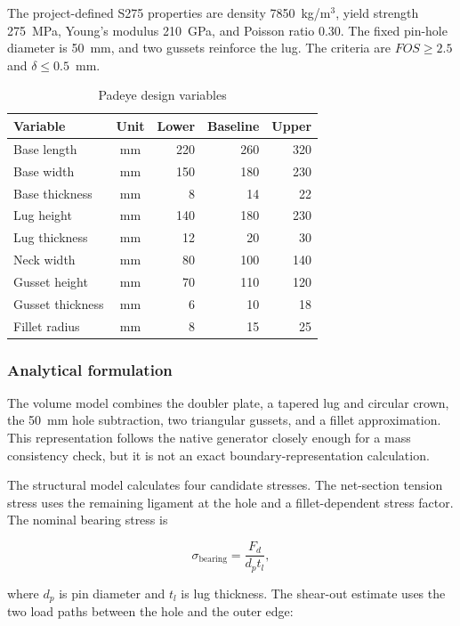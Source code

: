 The project-defined S275 properties are density 7850~kg/m$^3$, yield strength
275~MPa, Young's modulus 210~GPa, and Poisson ratio 0.30. The fixed pin-hole
diameter is 50~mm, and two gussets reinforce the lug. The criteria are
$FOS\geq2.5$ and $\delta\leq0.5$~mm.

\begin{table}[H]
\centering
\caption{Padeye design variables}
\label{tab:padeye-parameters}
\begin{tabularx}{\textwidth}{Xcrrr}
\toprule
\textbf{Variable} & \textbf{Unit} & \textbf{Lower} & \textbf{Baseline} &
\textbf{Upper}\\
\midrule
Base length & mm & 220 & 260 & 320\\
Base width & mm & 150 & 180 & 230\\
Base thickness & mm & 8 & 14 & 22\\
Lug height & mm & 140 & 180 & 230\\
Lug thickness & mm & 12 & 20 & 30\\
Neck width & mm & 80 & 100 & 140\\
Gusset height & mm & 70 & 110 & 120\\
Gusset thickness & mm & 6 & 10 & 18\\
Fillet radius & mm & 8 & 15 & 25\\
\bottomrule
\end{tabularx}
\end{table}

\subsubsection{Analytical formulation}
\label{sec:padeye-model}

The volume model combines the doubler plate, a tapered lug and circular crown,
the 50~mm hole subtraction, two triangular gussets, and a fillet
approximation. This representation follows the native generator closely enough
for a mass consistency check, but it is not an exact boundary-representation
calculation.

The structural model calculates four candidate stresses. The net-section
tension stress uses the remaining ligament at the hole and a
fillet-dependent stress factor. The nominal bearing stress is

\begin{equation}
\sigma_{\mathrm{bearing}}=
\frac{F_d}{d_p t_l},
\label{eq:padeye-bearing}
\end{equation}

where $d_p$ is pin diameter and $t_l$ is lug thickness. The shear-out
estimate uses the two load paths between the hole and the outer edge:

